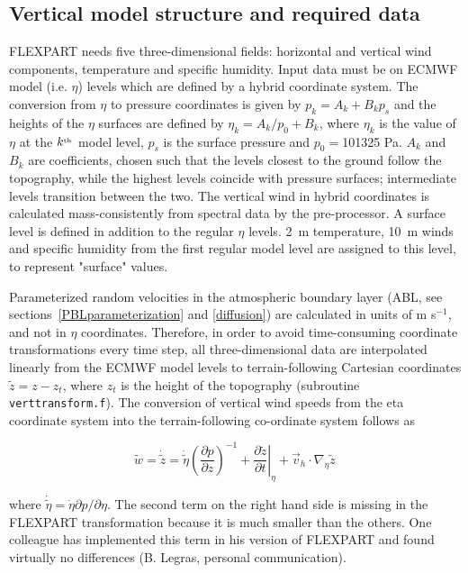 \documentclass{egu}            %
\begin{document}
\subsection{Vertical model structure and required data}

FLEXPART needs five three-dimensional fields: horizontal and vertical wind
components, temperature and specific humidity.  Input data must be on ECMWF
model (i.e.  $\eta$) levels which are defined by a hybrid coordinate system.
The conversion from $\eta$ to pressure coordinates is given by $p_k=A_k+B_kp_s$
and the heights of the $\eta$ surfaces are defined by $\eta_k=A_k/p_0+B_k$,
where $\eta_k$ is the value of $\eta$ at the $k^{\rm_{th}}$ model level, $p_s$
is the surface pressure and $p_0=$101325 Pa.  $A_k$ and $B_k$ are coefficients,
chosen such that the levels closest to the ground follow the topography, while
the highest levels coincide with pressure surfaces; intermediate levels
transition between the two.  The vertical wind in hybrid coordinates is
calculated mass-consistently from spectral data by the pre-processor.  A
surface level is defined in addition to the regular $\eta$ levels.  2~m
temperature, 10~m winds and specific humidity from the first regular model
level are assigned to this level, to represent "surface" values.

Parameterized random velocities in the atmospheric boundary layer (ABL, see
sections~\ref{PBLparameterization} and \ref{diffusion}) are calculated in units
of m s$^{-1}$, and not in $\eta$ coordinates.  Therefore, in order to avoid
time-consuming coordinate transformations every time step, all
three-dimensional data are interpolated linearly from the ECMWF model levels to
terrain-following Cartesian coordinates $\tilde{z}=z-z_t$, where $z_t$ is the
height of the topography (subroutine \verb|verttransform.f|).  The conversion
of vertical wind speeds from the eta coordinate system into the
terrain-following co-ordinate system follows as

\begin{equation}
\tilde{w}=\dot{\tilde{z}}=\dot{\tilde{\eta}} \left( \frac{\partial p}{\partial z} \right)^{-1} + \left.\frac{\partial \tilde{z}}{\partial t}\right|_\eta +  \vec{v}_h \cdot \nabla_\eta \tilde{z}  \,
\end{equation}

where $\dot{\tilde{\eta}}=\dot{\eta} \partial p / \partial \eta$.  The second
term on the right hand side is missing in the FLEXPART transformation because
it is much smaller than the others.  One colleague has implemented this term in
his version of FLEXPART and found virtually no differences (B.  Legras,
personal communication).
\end{document}
